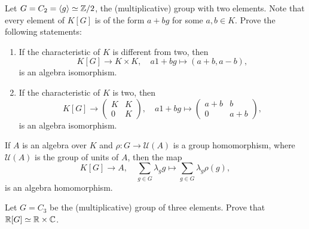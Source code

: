 \begin{exercise}
	Let $G=C_2=\langle g\rangle\simeq\mathbb{Z}/2$, the (multiplicative) 
	group with two elements. Note that every element of $K[G]$ is of the form
	$a+bg$ for some $a,b\in K$. Prove the following statements:
	\begin{enumerate}
	    \item If the characteristic of $K$ is different from two, then 
	    \[
		K[G]\to K\times K,
		\quad
		a1+bg\mapsto (a+b,a-b),
	\]
	is an algebra isomorphism. 
	\item If the characteristic of $K$ is two, then 
	\[
	K[G]\to \begin{pmatrix}
			K & K\\
			0 & K
		\end{pmatrix},
		\quad
		a1+bg\mapsto\begin{pmatrix}
			a+b & b\\
			0 & a+b
		\end{pmatrix},
	\]
	is an algebra isomorphism. 
	\end{enumerate}
\end{exercise}

If $A$ is an algebra over $K$ and $\rho\colon G\to \mathcal{U}(A)$
is a group homomorphism, where $\mathcal{U}(A)$ is the group of units of $A$, then 
the map \[
	K[G]\to A,\quad 
\sum_{g\in G}\lambda_gg\mapsto\sum_{g\in G}\lambda_g\rho(g),
\]
is an algebra homomorphism. 

\begin{exercise}
	Let $G=C_3$ be the (multiplicative) group of three elements. Prove that
	$\mathbb{R}[G]\simeq\mathbb{R}\times\mathbb{C}$.
\end{exercise}

